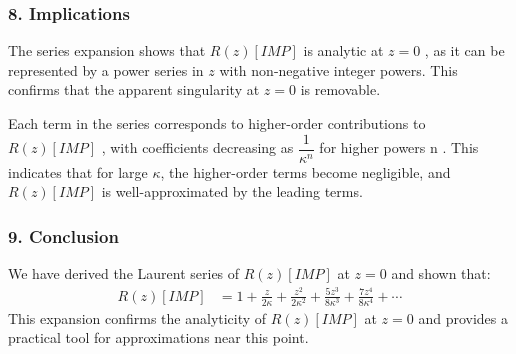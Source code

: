 \subsubsection*{8. Implications}

The series expansion shows that  $R(z)[IMP]$   is analytic at  $z=0$ , as it can be represented by a power series in  $z$  with non-negative integer powers. This confirms that the apparent singularity at $z=0$  is removable.

Each term in the series corresponds to higher-order contributions to  $R(z)[IMP]$ ,
with coefficients decreasing as $\dfrac{1}{\kappa^n}$ for higher powers  n .
This indicates that for large  $\kappa$,
the higher-order terms become negligible, and  $R(z)[IMP]$  is well-approximated by the leading terms.

\subsubsection*{9. Conclusion}

We have derived the Laurent series of  $R(z)[IMP]$  at  $z=0$  and shown that:
\begin{align}
R(z)[IMP] &= 1 + \frac{z}{2\kappa} + \frac{z^2}{2\kappa^2} + \frac{5z^3}{8\kappa^3} + \frac{7z^4}{8\kappa^4} + \cdots
\end{align}
This expansion confirms the analyticity of
$R(z)[IMP]$  at $z=0$  and provides a practical tool for approximations  near this point.


